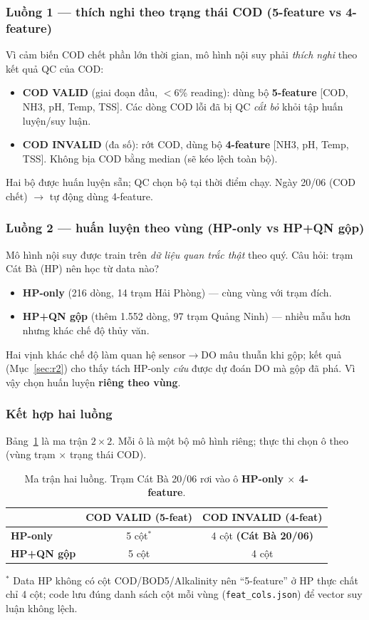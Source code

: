 \subsubsection{Luồng 1 --- thích nghi theo trạng thái COD (5-feature vs 4-feature)}
Vì cảm biến COD chết phần lớn thời gian, mô hình nội suy phải \emph{thích nghi} theo kết quả QC của COD:
\begin{itemize}[nosep]
  \item \textbf{COD VALID} (giai đoạn đầu, $<6$\% reading): dùng bộ \textbf{5-feature} [COD, NH3, pH, Temp, TSS]. Các dòng COD lỗi đã bị QC \emph{cắt bỏ} khỏi tập huấn luyện/suy luận.
  \item \textbf{COD INVALID} (đa số): rớt COD, dùng bộ \textbf{4-feature} [NH3, pH, Temp, TSS]. Không bịa COD bằng median (sẽ kéo lệch toàn bộ).
\end{itemize}
Hai bộ được huấn luyện sẵn; QC chọn bộ tại thời điểm chạy. Ngày 20/06 (COD chết) $\to$ tự động dùng 4-feature.

\subsubsection{Luồng 2 --- huấn luyện theo vùng (HP-only vs HP+QN gộp)}
Mô hình nội suy được train trên \emph{dữ liệu quan trắc thật} theo quý. Câu hỏi: trạm Cát Bà (HP) nên học từ data nào?
\begin{itemize}[nosep]
  \item \textbf{HP-only} (216 dòng, 14 trạm Hải Phòng) --- cùng vùng với trạm đích.
  \item \textbf{HP+QN gộp} (thêm 1.552 dòng, 97 trạm Quảng Ninh) --- nhiều mẫu hơn nhưng khác chế độ thủy văn.
\end{itemize}
Hai vịnh khác chế độ làm quan hệ sensor$\to$DO mâu thuẫn khi gộp; kết quả (Mục~\ref{sec:r2}) cho thấy tách HP-only \emph{cứu} được dự đoán DO mà gộp đã phá. Vì vậy chọn huấn luyện \textbf{riêng theo vùng}.

\subsubsection{Kết hợp hai luồng}
Bảng~\ref{tab:hailuong} là ma trận $2\times2$. Mỗi ô là một bộ mô hình riêng; thực thi chọn ô theo (vùng trạm $\times$ trạng thái COD).

\begin{table}[h]
\centering\small
\caption{Ma trận hai luồng. Trạm Cát Bà 20/06 rơi vào ô \textbf{HP-only $\times$ 4-feature}.}
\label{tab:hailuong}
\begin{tabular}{lcc}
\toprule
& \textbf{COD VALID (5-feat)} & \textbf{COD INVALID (4-feat)} \\
\midrule
\textbf{HP-only}     & 5 cột$^*$ & 4 cột \textbf{(Cát Bà 20/06)} \\
\textbf{HP+QN gộp}   & 5 cột & 4 cột \\
\bottomrule
\end{tabular}

{\footnotesize $^*$ Data HP không có cột COD/BOD5/Alkalinity nên ``5-feature'' ở HP thực chất chỉ 4 cột; code lưu đúng danh sách cột mỗi vùng (\texttt{feat\_cols.json}) để vector suy luận không lệch.}
\end{table}

